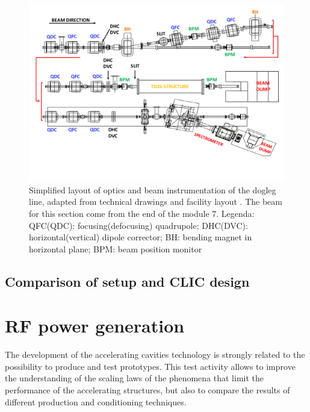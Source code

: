 \begin{landscape}
\begin{figure}
\centering 
\includegraphics[scale=0.78]{pictures/modified_pets.pdf}
\caption{Simplified layout of optics and beam instrumentation of the dogleg line, adapted from technical drawings and facility layout \cite{EDMS:CTF3}. The beam for this section come from the end of the module 7. Legenda: QFC(QDC): focusing(defocusing) quadrupole; DHC(DVC): horizontal(vertical) dipole corrector; BH: bending magnet in horizontal plane; BPM: beam position monitor}
\label{dolaut}
\end{figure}
\end{landscape}



\subsection[Comparison of setup and CLIC design]{Comparison of setup and CLIC design}



\section[RF power generation]{RF power generation}

The development of the accelerating cavities technology is strongly related to the possibility to produce and test prototypes. This test activity allows to improve the understanding of the scaling laws of the phenomena that limit the performance of the accelerating structures, but also to compare the results of different production and conditioning techniques. 

